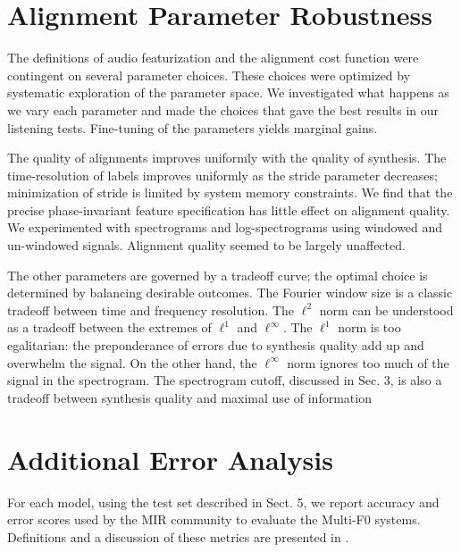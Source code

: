 \documentclass{article} \usepackage{iclr2017_conference,times}
\begin{document}
\fi
 \FloatBarrier

\clearpage

\section{Alignment Parameter Robustness}

The definitions of audio featurization and the alignment cost function were contingent on several parameter choices. These choices were optimized by systematic exploration of the parameter space. We investigated what happens as we vary each parameter and made the choices that gave the best results in our listening tests. Fine-tuning of the parameters yields marginal gains.


The quality of alignments improves uniformly with the quality of synthesis. The time-resolution of labels improves uniformly as the stride parameter decreases; minimization of stride is limited by system memory constraints. We find that the precise phase-invariant feature specification has little effect on alignment quality. We experimented with spectrograms and log-spectrograms using windowed and un-windowed signals. Alignment quality seemed to be largely unaffected.

The other parameters are governed by a tradeoff curve; the optimal choice is determined by balancing desirable outcomes. The Fourier window size is a classic tradeoff between time and frequency resolution. The $\ell^2$ norm can be understood as a tradeoff between the extremes of $\ell^1$ and $\ell^\infty$. The $\ell^1$ norm is too egalitarian: the preponderance of errors due to synthesis quality add up and overwhelm the signal. On the other hand, the $\ell^\infty$ norm ignores too much of the signal in the spectrogram. The spectrogram cutoff, discussed in Sec. 3, is also a tradeoff between synthesis quality and maximal use of information \section{Additional Error Analysis}

For each model, using the test set described in Sect. 5, we report accuracy and error scores used by the MIR community to evaluate the Multi-F0 systems. Definitions and a discussion of these metrics are presented in \cite{poliner2007}.
\end{document}
